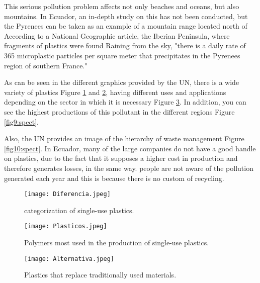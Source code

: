 \documentclass[10pt,english, openany]{book}
\begin{document}
This serious pollution problem affects not only beaches and oceans, but also mountains.\cite{microplastics} In Ecuador, an in-depth study on this has not been conducted, but the Pyrenees can be taken as an example of a mountain range located north of According to a National Geographic article, the Iberian Peninsula, where fragments of plastics were found Raining from the sky, "there is a daily rate of 365 microplastic particles per square meter that precipitates in the Pyrenees region of southern France." \cite{Pirineos}

As can be seen in the different graphics provided by the UN, there is a wide variety of plastics Figure \ref{fig6:spect} and \ref{fig7:spect}, having different uses and applications depending on the sector in which it is necessary Figure \ref{fig8:spect}. In addition, you can see the highest productions of this pollutant in the different regions Figure \ref{fig9:spect}.

Also, the UN provides an image of the hierarchy of waste management Figure \ref{fig10:spect}. In Ecuador, many of the large companies do not have a good handle on plastics, due to the fact that it supposes a higher cost in production and therefore generates losses, in the same way. people are not aware of the pollution generated each year and this is because there is no custom of recycling.

\begin{figure}[h!]
    \centering\texttt{[image: Diferencia.jpeg]}
    \caption{categorization of single-use plastics. \cite{ONU}}
    \label{fig6:spect} 
\end{figure}
    
\begin{figure}[h!]
    \centering\texttt{[image: Plasticos.jpeg]}
    \caption{Polymers most used in the production of single-use plastics.\cite{ONU}}
    \label{fig7:spect}
\end{figure}
    
\vspace{1cm}

\pagebreak

\begin{figure}[h!]
    \centering\texttt{[image: Alternativa.jpeg]}
    \caption{Plastics that replace traditionally used materials.\cite{ONU}}
    \label{fig8:spect}
\end{figure}
    
\vspace{1cm}
\end{document}
